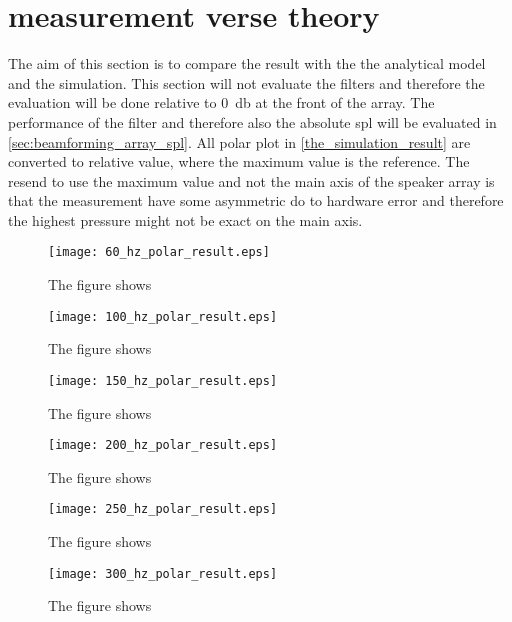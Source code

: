 \section{measurement verse theory}

The aim of this section is to compare the result with the the analytical model and the simulation. This section will not evaluate the filters and therefore the evaluation will be done relative to \SI{0}{\decibel} at the front of the array. The performance of the filter and therefore also the absolute \gls{spl} will be evaluated in \autoref{sec:beamforming_array_spl}. All polar plot in \autoref{the_simulation_result} are converted to relative value, where the maximum value is the reference. The resend to use the maximum value and not the main axis of the speaker array is that the measurement have some asymmetric do to hardware error and therefore the highest pressure might not be exact on the main axis. 



 \begin{figure}[H]
	\centering
	\texttt{[image: 60\_hz\_polar\_result.eps]}
	\caption{The figure shows}
		\label{fig:60_hz_polar_result}
\end{figure}

 \begin{figure}[H]
	\centering
	\texttt{[image: 100\_hz\_polar\_result.eps]}
	\caption{The figure shows}
		\label{fig:100_hz_polar_result}
\end{figure}

 \begin{figure}[H]
	\centering
	\texttt{[image: 150\_hz\_polar\_result.eps]}
	\caption{The figure shows}
		\label{fig:150_hz_polar_result}
\end{figure}

 \begin{figure}[H]
	\centering
	\texttt{[image: 200\_hz\_polar\_result.eps]}
	\caption{The figure shows}
		\label{fig:200_hz_polar_result}
\end{figure}


 \begin{figure}[H]
	\centering
	\texttt{[image: 250\_hz\_polar\_result.eps]}
	\caption{The figure shows}
		\label{fig:250_hz_polar_result}
\end{figure}

 \begin{figure}[H]
	\centering
	\texttt{[image: 300\_hz\_polar\_result.eps]}
	\caption{The figure shows}
		\label{fig:300_hz_polar_result}
\end{figure}








